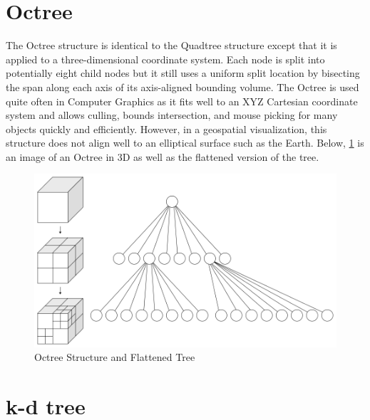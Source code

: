 \section{Octree}

The Octree structure is identical to the Quadtree structure except that it is
applied to a three-dimensional coordinate system. Each node is split into
potentially eight child nodes but it still uses a uniform split location by
bisecting the span along each axis of its axis-aligned bounding volume. The
Octree is used quite often in Computer Graphics as it fits well to an XYZ
Cartesian coordinate system and allows culling, bounds intersection, and mouse
picking for many objects quickly and efficiently. However, in a geospatial
visualization, this structure does not align well to an elliptical surface such
as the Earth. Below, \ref{fig:octree} is an image of an Octree in 3D as well as the
flattened version of the tree.

\begin{figure}[htb]
\begin{center}
\includegraphics[width=.9\linewidth]{images/Octree_flat.png}
\end{center}
\caption{Octree Structure and Flattened Tree \cite{11_octree2.png}}
\label{fig:octree}
\end{figure}

\section{k-d tree}

